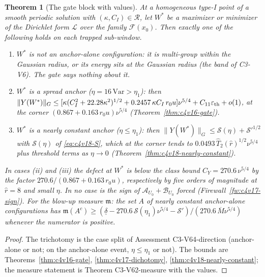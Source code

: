 \documentclass[11pt]{article}
\theoremstyle{plain}
\newtheorem{theorem}{Theorem}[section]
\theoremstyle{definition}
\theoremstyle{remark}
\begin{document}
\begin{theorem}[The gate block with values]
\label{thm:c4v19-block}
At a homogeneous type-I point of a smooth periodic solution with
\((\kappa,C_I)\in\mathcal R\), let \(W^*\) be a maximizer or minimizer of the Dirichlet
form \(\mathcal L\) over the family \(\mathcal F(x_0)\).  Then exactly one of the following
holds on each trapped sub-window.
\begin{enumerate}[label=\textup{(\roman*)},leftmargin=3.2em]
\item \(W^*\) is not an anchor-alone configuration: it is multi-group
      within the Gaussian radius, or its energy sits at the Gaussian
      radius (the band of C3-V6).  The gate says nothing about it.
\item \(W^*\) is a spread anchor (\(\eta=16\,\mathrm{Var}>\eta_1\)): then
      \(\|Y(W^*)\|_G\le[\kappa(C_I^2+22.28\kappa^2)^{1/2}+0.2457\,\kappa C_I\,r_0u]\nu^{5/4}+C_{11}\varepsilon_{\rm th}+o(1)\),
      at the corner \((0.867+0.163\,r_0u)\nu^{5/4}\) (Theorem~\ref{thm:c4v16-gate}).
\item \(W^*\) is a nearly constant anchor (\(\eta\le\eta_1\)): then
      \(\|Y(W^*)\|_G\le\mathcal S(\eta)+\mathcal S'^{1/2}\) with \(\mathcal S(\eta)\) of \eqref{eq:c4v18-S}, which at
      the corner tends to \(0.0493\,\widehat T_2(\hat r)^{1/2}\nu^{5/4}\) plus threshold terms
      as \(\eta\to0\) (Theorem~\ref{thm:c4v18-nearly-constant}).
\end{enumerate}
In cases (ii) and (iii) the defect at \(W^*\) is below the class bound
\(C_Y=270.6\,\nu^{5/4}\) by the factor \(270.6/(0.867+0.163\,r_0u)\), respectively by
five orders of magnitude at \(\hat r=8\) and small \(\eta\).  In no case is the
sign of \(\mathcal A_{U_0}+\mathcal B_{U_0}\) forced (Firewall~\ref{fw:c4v17-sign}).  For the
blow-up measure \(\mathfrak m\): the set \(A\) of nearly constant anchor-alone
configurations has \(\mathfrak m(A^c)\ge(\underline\delta-270.6\,\mathcal S(\eta_1)\nu^{5/4}-\mathcal S')/(270.6\,\overline M\nu^{5/4})\)
whenever the numerator is positive.
\end{theorem}

\begin{proof}
The trichotomy is the case split of Assessment C3-V64-direction
(anchor-alone or not; on the anchor-alone event, \(\eta\le\eta_1\) or not).
The bounds are Theorems~\ref{thm:c4v16-gate}, \ref{thm:c4v17-dichotomy},
\ref{thm:c4v18-nearly-constant}; the measure statement is Theorem
C3-V62-measure with the values.
\end{proof}
\end{document}
